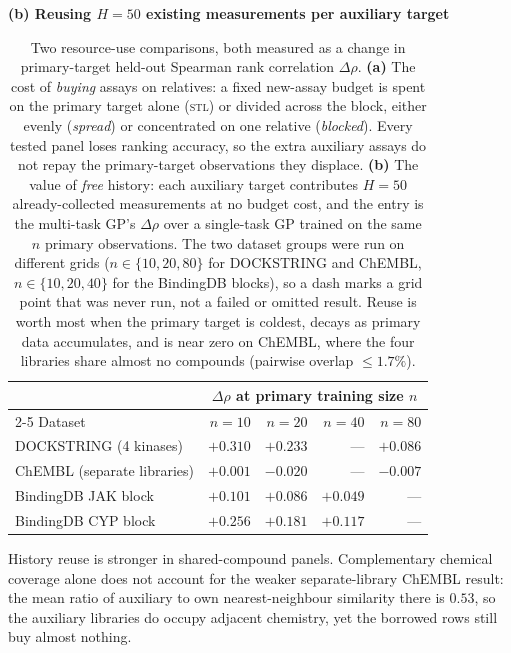 \documentclass[10pt]{article}
\newcommand{\stl}{\textsc{stl}}
\begin{document}
\begin{table}[htbp]
\medskip
\textbf{(b) Reusing $H=50$ existing measurements per auxiliary target}\\[3pt]
\begin{tabular}{lrrrr}
\toprule
& \multicolumn{4}{c}{$\Delta\rho$ at primary training size $n$}\\
\cmidrule(lr){2-5}
Dataset & $n=10$ & $n=20$ & $n=40$ & $n=80$ \\
\midrule
DOCKSTRING (4 kinases)      & $+0.310$ & $+0.233$ & ---      & $+0.086$ \\
ChEMBL (separate libraries) & $+0.001$ & $-0.020$ & ---      & $-0.007$ \\
BindingDB JAK block         & $+0.101$ & $+0.086$ & $+0.049$ & ---      \\
BindingDB CYP block         & $+0.256$ & $+0.181$ & $+0.117$ & ---      \\
\bottomrule
\end{tabular}
\caption{Two resource-use comparisons, both measured as a change in
primary-target held-out Spearman rank correlation $\Delta\rho$.
\textbf{(a)} The cost of \emph{buying} assays on relatives: a fixed new-assay
budget is spent on the primary target alone (\stl{}) or divided across the
block, either evenly (\emph{spread}) or concentrated on one relative
(\emph{blocked}). Every tested panel loses ranking accuracy, so the extra
auxiliary assays do not repay the primary-target observations they displace.
\textbf{(b)} The value of \emph{free} history: each auxiliary target
contributes $H=50$ already-collected measurements at no budget cost, and the
entry is the multi-task GP's $\Delta\rho$ over a single-task GP trained on
the same $n$ primary observations. The two dataset groups were run on
different grids ($n\in\{10,20,80\}$ for DOCKSTRING and ChEMBL,
$n\in\{10,20,40\}$ for the BindingDB blocks), so a dash marks a grid point
that was never run, not a failed or omitted result. Reuse is worth most when
the primary target is coldest, decays as primary data accumulates, and is
near zero on ChEMBL, where the four libraries share almost no compounds
(pairwise overlap $\le1.7\%$).}
\label{tab:sharing}
\end{table}

History reuse is stronger in shared-compound panels. Complementary chemical
coverage alone does not account for the weaker separate-library ChEMBL
result: the mean ratio of auxiliary to own nearest-neighbour similarity there
is $0.53$, so the auxiliary libraries do occupy adjacent chemistry, yet the
borrowed rows still buy almost nothing.
\end{document}
